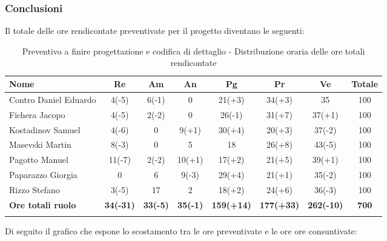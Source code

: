 \documentclass[../piano_di_progetto.tex]{subfiles}
\begin{document}
\subsubsection{Conclusioni}%
\label{sub:cons_con_4}
Il totale delle ore rendicontate preventivate per il progetto diventano le seguenti:
\begin{center}
	\begin{longtable}{|l|c|c|c|c|c|c|c|}
		\hline
		\rowcolor{lightgray}
		\textbf{Nome} & \textbf{Re} & \textbf{Am} & \textbf{An} & \textbf{Pg}  & \textbf{Pr}   & \textbf{Ve} & \textbf{Totale} \\

		\hline
			Contro Daniel Eduardo & 4(-5) & 6(-1) & 0 & 21(+3) & 34(+3) & 35 & 100 \\
			Fichera Jacopo & 4(-5) & 2(-2) & 0 & 26(-1) & 31(+7) & 37(+1) & 100 \\
			Kostadinov Samuel & 4(-6) & 0 & 9(+1) & 30(+4) & 20(+3) & 37(-2) & 100 \\		
			Masevski Martin & 8(-3) & 0 & 5 & 18 & 26(+8) & 43(-5) & 100 \\
			Pagotto Manuel & 11(-7) & 2(-2) & 10(+1) & 17(+2) & 21(+5) & 39(+1) & 100 \\			
			Paparazzo Giorgia & 0 & 6 & 9(-3) & 29(+4) & 21(+1) & 35(-2) & 100 \\
			Rizzo Stefano & 3(-5) & 17 & 2 & 18(+2) & 24(+6) & 36(-3) & 100 \\
			\hline
			\textbf{Ore totali ruolo} & \textbf{34(-31)} & \textbf{33(-5)} & \textbf{35(-1)} & \textbf{159(+14)} & \textbf{177(+33)} & \textbf{262(-10)} & \textbf{700} \\
		\hline	
		\rowcolor{white}
		\caption{Preventivo a finire progettazione e codifica di dettaglio - Distribuzione oraria delle ore totali rendicontate}
	\end{longtable}
\end{center}





Di seguito il grafico che espone lo scostamento tra le ore preventivate e le ore ore consuntivate:


\end{document}
